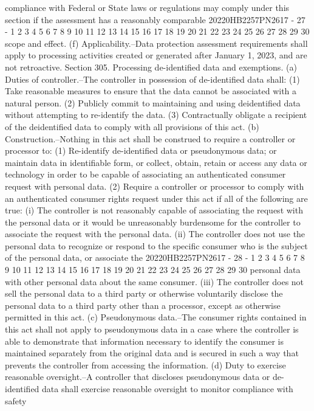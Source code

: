 compliance with Federal or State laws or regulations may comply
under this section if the assessment has a reasonably comparable
20220HB2257PN2617 - 27 -
1
2
3
4
5
6
7
8
9
10
11
12
13
14
15
16
17
18
19
20
21
22
23
24
25
26
27
28
29
30
scope and effect.
(f) Applicability.--Data protection assessment requirements
shall apply to processing activities created or generated after
January 1, 2023, and are not retroactive.
Section 305. Processing de-identified data and exemptions.
(a) Duties of controller.--The controller in possession of
de-identified data shall:
(1) Take reasonable measures to ensure that the data
cannot be associated with a natural person.
(2) Publicly commit to maintaining and using deidentified data without attempting to re-identify the data.
(3) Contractually obligate a recipient of the deidentified data to comply with all provisions of this act.
(b) Construction.--Nothing in this act shall be construed to
require a controller or processor to:
(1) Re-identify de-identified data or pseudonymous data;
or maintain data in identifiable form, or collect, obtain,
retain or access any data or technology in order to be
capable of associating an authenticated consumer request with
personal data.
(2) Require a controller or processor to comply with an
authenticated consumer rights request under this act if all
of the following are true:
(i) The controller is not reasonably capable of
associating the request with the personal data or it
would be unreasonably burdensome for the controller to
associate the request with the personal data.
(ii) The controller does not use the personal data
to recognize or respond to the specific consumer who is
the subject of the personal data, or associate the
20220HB2257PN2617 - 28 -
1
2
3
4
5
6
7
8
9
10
11
12
13
14
15
16
17
18
19
20
21
22
23
24
25
26
27
28
29
30
personal data with other personal data about the same
consumer.
(iii) The controller does not sell the personal data
to a third party or otherwise voluntarily disclose the
personal data to a third party other than a processor,
except as otherwise permitted in this act.
(c) Pseudonymous data.--The consumer rights contained in
this act shall not apply to pseudonymous data in a case where
the controller is able to demonstrate that information necessary
to identify the consumer is maintained separately from the
original data and is secured in such a way that prevents the
controller from accessing the information.
(d) Duty to exercise reasonable oversight.--A controller
that discloses pseudonymous data or de-identified data shall
exercise reasonable oversight to monitor compliance with safety
